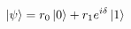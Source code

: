 \documentclass[preview]{standalone}
\begin{document}
\begin{align*}
\ket{\psi} = r_0 \ket{0} + r_1e^{i\delta} \ket{1}
\end{align*}
\end{document}
